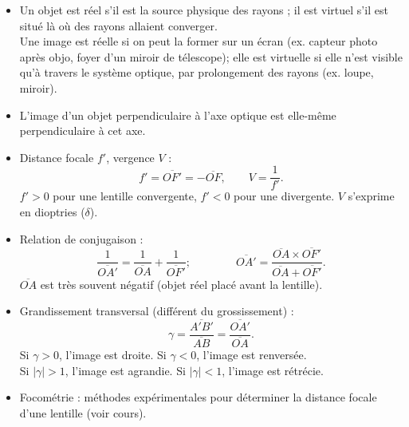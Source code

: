 \documentclass[a4paper,12pt]{article}
\begin{document}
\begin{itemize}
    \item Un objet est réel s'il est la source physique des rayons ; 
    il est virtuel s'il est situé là où des rayons allaient converger. \\
    Une image est réelle si on peut la former sur un écran (ex. capteur photo après objo, foyer d'un miroir de télescope); 
    elle est virtuelle si elle n'est visible qu'à travers le système optique, par prolongement des rayons (ex. loupe, miroir).
    
    \item L'image d'un objet perpendiculaire à l'axe optique est elle-même perpendiculaire à cet axe.

    \item Distance focale $f'$, vergence $V$ :
    \[ f' = \overline{OF'} = - \overline{OF}, \qquad V = \frac{1}{f'}. \]
    $f' > 0$ pour une lentille convergente, $f' < 0$ pour une divergente. $V$ s'exprime en dioptries ($\delta$).
    
    \item Relation de conjugaison :
    \[ \frac{1}{\overline{OA'}} = \frac{1}{\overline{OA}} + \frac{1}{\overline{OF'}}; \qquad \qquad \overline{OA'} = \frac{\overline{OA} \times \overline{OF'}}{\overline{OA} + \overline{OF'}}. \]
    $\overline{OA}$ est très souvent négatif (objet réel placé avant la lentille).
    
    \item Grandissement transversal (différent du grossissement) :
    \[ \gamma = \frac{\overline{A'B'}}{\overline{AB}} = \frac{\overline{OA'}}{\overline{OA}}. \]
    Si $\gamma > 0$, l'image est droite. Si $\gamma < 0$, l'image est renversée. \\
    Si $|\gamma| > 1$, l'image est agrandie. Si $|\gamma| < 1$, l'image est rétrécie.
    
    \item Focométrie : méthodes expérimentales pour déterminer la distance focale d'une lentille (voir cours).
    
\end{itemize}
\end{document}
